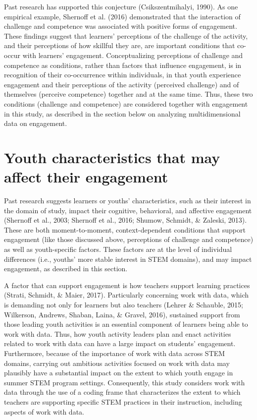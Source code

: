 \documentclass[]{book}
\theoremstyle{definition}
\theoremstyle{definition}
\theoremstyle{definition}
\theoremstyle{remark}
\begin{document}
Past research has supported this conjecture (Csikszentmihalyi, 1990). As
one empirical example, Shernoff et al. (2016) demonstrated that the
interaction of challenge and competence was associated with positive
forms of engagement. These findings suggest that learners' perceptions
of the challenge of the activity, and their perceptions of how skillful
they are, are important conditions that co-occur with learners'
engagement. Conceptualizing perceptions of challenge and competence as
conditions, rather than factors that influence engagement, is in
recognition of their co-occurrence within individuals, in that youth
experience engagement and their perceptions of the activity (perceived
challenge) and of themselves (perceive competence) together and at the
same time. Thus, these two conditions (challenge and competence) are
considered together with engagement in this study, as described in the
section below on analyzing multidimensional data on engagement.

\section{Youth characteristics that may affect their
engagement}\label{youth-characteristics-that-may-affect-their-engagement}

Past research suggests learners or youths' characteristics, such as
their interest in the domain of study, impact their cognitive,
behavioral, and affective engagement (Shernoff et al., 2003; Shernoff et
al., 2016; Shumow, Schmidt, \& Zaleski, 2013). These are both
moment-to-moment, context-dependent conditions that support engagement
(like those discussed above, perceptions of challenge and competence) as
well as youth-specific factors. These factors are at the level of
individual differences (i.e., youths' more stable interest in STEM
domains), and may impact engagement, as described in this section.

A factor that can support engagement is how teachers support learning
practices (Strati, Schmidt, \& Maier, 2017). Particularly concerning
work with data, which is demanding not only for learners but also
teachers (Lehrer \& Schauble, 2015; Wilkerson, Andrews, Shaban, Laina,
\& Gravel, 2016), sustained support from those leading youth activities
is an essential component of learners being able to work with data.
Thus, how youth activity leaders plan and enact activities related to
work with data can have a large impact on students' engagement.
Furthermore, because of the importance of work with data across STEM
domains, carrying out ambitious activities focused on work with data may
plausibly have a substantial impact on the extent to which youth engage
in summer STEM program settings. Consequently, this study considers work
with data through the use of a coding frame that characterizes the
extent to which teachers are supporting specific STEM practices in their
instruction, including aspects of work with data.
\end{document}
